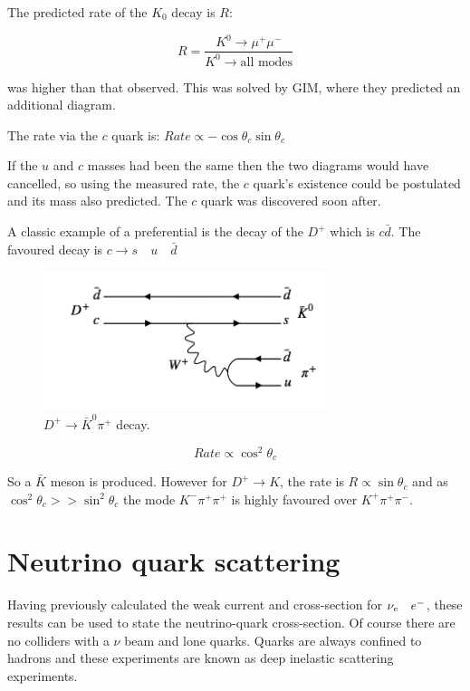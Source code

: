 The predicted rate of the $K_0$ decay is $R$:

\[
  R = \frac{K^0 \to \mu^+\mu^-}{K^0 \to \textrm{all modes}}
\]

was higher than that observed.  This was solved by GIM, where they predicted an additional diagram.

The rate via the $c$ quark is: $Rate \propto -\cos\theta_c\sin\theta_c$

If the $u$ and $c$ masses had been the same then the two diagrams would have cancelled, so using the measured rate, the $c$ quark's existence could be postulated and its mass also predicted.  The $c$ quark was discovered soon after.

A classic example of a preferential is the decay of the $D^+$ which is $c\bar{d}$.  The favoured decay is $c \to s \quad u \quad \bar{d}$

\begin{figure}[!htb]
  \begin{center}
    \includegraphics[width=0.75\textwidth]{images/web_feynman/image_50.png}
    \caption[$D^+\to\bar{K}^0\pi^+$ decay]{$D^+\to\bar{K}^0\pi^+$ decay.}
    \label{fig:ch12_DToK0Pi}
  \end{center}
\end{figure}

\[
  Rate \propto \cos^2\theta_c
\]

So a $\bar{K}$ meson is produced.  However for $D^+ \to K$, the rate is $R \propto \sin\theta_c$ and as $\cos^2\theta_c >> \sin^2\theta_c$ the mode $K^- \pi^+ \pi^+$ is highly favoured over $K^+ \pi^+ \pi^-$.

\clearpage

\section{Neutrino quark scattering}

Having previously calculated the weak current and cross-section for $\nu_{e} \quad e^-$, these results can be used to state the neutrino-quark cross-section.  Of course there are no colliders with a $\nu$ beam and lone quarks.  Quarks are always confined to hadrons and these experiments are known as deep inelastic scattering experiments.

